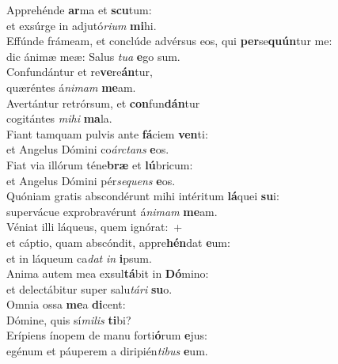 \evenverse Apprehénde \textbf{ar}ma et \textbf{scu}tum:~\*\\
\evenverse et exsúrge in adjutó\textit{ri}\textit{um} \textbf{mi}hi.\\
\oddverse Effúnde frámeam, et conclúde advérsus eos, qui \textbf{per}se\textbf{quún}tur me:~\*\\
\oddverse dic ánimæ meæ: Salus \textit{tu}\textit{a} \textbf{e}go sum.\\
\evenverse Confundántur et re\textbf{ve}re\textbf{án}tur,~\*\\
\evenverse quæréntes á\textit{ni}\textit{mam} \textbf{me}am.\\
\oddverse Avertántur retrórsum, et \textbf{con}fun\textbf{dán}tur~\*\\
\oddverse cogitántes \textit{mi}\textit{hi} \textbf{ma}la.\\
\evenverse Fiant tamquam pulvis ante \textbf{fá}ciem \textbf{ven}ti:~\*\\
\evenverse et Angelus Dómini co\textit{ár}\textit{ctans} \textbf{e}os.\\
\oddverse Fiat via illórum téne\textbf{bræ} et \textbf{lú}bricum:~\*\\
\oddverse et Angelus Dómini pér\textit{se}\textit{quens} \textbf{e}os.\\
\evenverse Quóniam gratis abscondérunt mihi intéritum \textbf{lá}quei \textbf{su}i:~\*\\
\evenverse supervácue exprobravérunt á\textit{ni}\textit{mam} \textbf{me}am.\\
\oddverse Véniat illi láqueus, quem ignórat:~+\\
\oddverse  et cáptio, quam abscóndit, appre\textbf{hén}dat \textbf{e}um:~\*\\
\oddverse et in láqueum ca\textit{dat} \textit{in} \textbf{i}psum.\\
\evenverse Anima autem mea exsul\textbf{tá}bit in \textbf{Dó}mino:~\*\\
\evenverse et delectábitur super salu\textit{tá}\textit{ri} \textbf{su}o.\\
\oddverse Omnia ossa \textbf{me}a \textbf{di}cent:~\*\\
\oddverse Dómine, quis sí\textit{mi}\textit{lis} \textbf{ti}bi?\\
\evenverse Erípiens ínopem de manu forti\textbf{ó}rum \textbf{e}jus:~\*\\
\evenverse egénum et páuperem a diripién\textit{ti}\textit{bus} \textbf{e}um.\\
